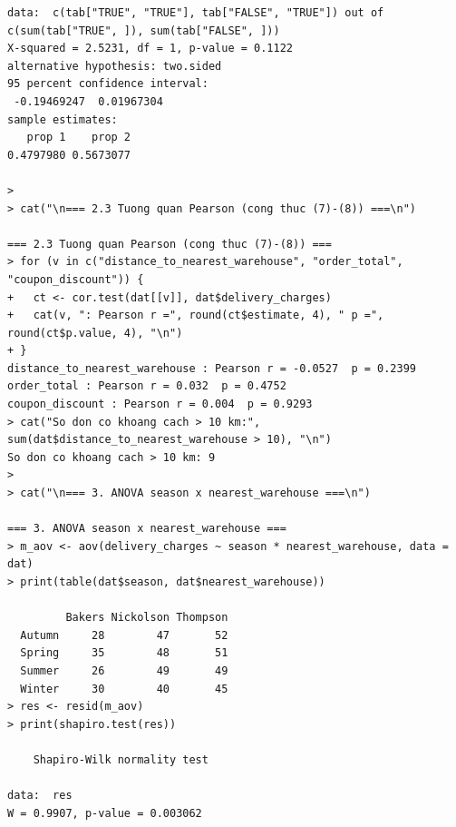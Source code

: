 \documentclass[12pt, a4paper]{article}
\begin{document}
\begin{lstlisting}
data:  c(tab["TRUE", "TRUE"], tab["FALSE", "TRUE"]) out of c(sum(tab["TRUE", ]), sum(tab["FALSE", ]))
X-squared = 2.5231, df = 1, p-value = 0.1122
alternative hypothesis: two.sided
95 percent confidence interval:
 -0.19469247  0.01967304
sample estimates:
   prop 1    prop 2 
0.4797980 0.5673077 

> 
> cat("\n=== 2.3 Tuong quan Pearson (cong thuc (7)-(8)) ===\n")

=== 2.3 Tuong quan Pearson (cong thuc (7)-(8)) ===
> for (v in c("distance_to_nearest_warehouse", "order_total", "coupon_discount")) {
+   ct <- cor.test(dat[[v]], dat$delivery_charges)
+   cat(v, ": Pearson r =", round(ct$estimate, 4), " p =", round(ct$p.value, 4), "\n")
+ }
distance_to_nearest_warehouse : Pearson r = -0.0527  p = 0.2399 
order_total : Pearson r = 0.032  p = 0.4752 
coupon_discount : Pearson r = 0.004  p = 0.9293 
> cat("So don co khoang cach > 10 km:", sum(dat$distance_to_nearest_warehouse > 10), "\n")
So don co khoang cach > 10 km: 9 
> 
> cat("\n=== 3. ANOVA season x nearest_warehouse ===\n")

=== 3. ANOVA season x nearest_warehouse ===
> m_aov <- aov(delivery_charges ~ season * nearest_warehouse, data = dat)
> print(table(dat$season, dat$nearest_warehouse))        
        
         Bakers Nickolson Thompson
  Autumn     28        47       52
  Spring     35        48       51
  Summer     26        49       49
  Winter     30        40       45
> res <- resid(m_aov)
> print(shapiro.test(res))                               

	Shapiro-Wilk normality test

data:  res
W = 0.9907, p-value = 0.003062


\end{lstlisting}
\end{document}
